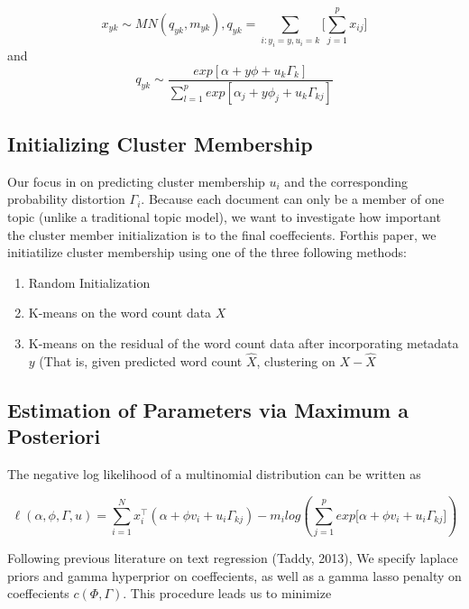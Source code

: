 \documentclass[12pt]{article}
\begin{document}
\begin{equation}
 x_{yk} \sim MN(q_{yk},m_{yk}), q_{yk} = \sum\limits_{i: y_i = y, u_i = k} \big[\sum_{j = 1}^{p} {x_{ij}} \big]
\end{equation}
and 
\begin{equation}
q_{yk} \sim \frac{exp[\alpha + y \phi  + u_k \Gamma_{k}]}{\sum_{l=1}^{p} exp[\alpha_j + y \phi_j+ u_k \Gamma_{kj} ]}
\end{equation}

\subsection{Initializing Cluster Membership}

Our focus in on predicting cluster membership $u_i$ and the
corresponding probability distortion $\Gamma_i$. Because each document can only be a member of one topic (unlike a traditional topic model), we want to investigate how important the cluster member initialization is to the final coeffecients. 
Forthis paper, we initiatilize cluster membership using one of the three following
methods:

\begin{enumerate}
\def\labelenumi{\arabic{enumi}.}
\itemsep1pt\parskip0pt
\item
  Random Initialization
\item
  K-means on the word count data $X$
\item
  K-means on the residual of the word count data after incorporating
  metadata $y$ (That is, given predicted word count $\hat{X}$,
  clustering on $X-\hat{X}$
\end{enumerate}

\subsection{Estimation of Parameters via Maximum a
Posteriori}\label{estimation-of-parameters-via-maximum-a-posteriori}

The negative log likelihood of a multinomial distribution can be written
as

\begin{equation} 
\ell(\alpha,\phi,\Gamma,u) = \sum_{i = 1}^{N}{ x_i^\top (\alpha + \phi v_i + u_i \Gamma_{kj})} - m_i log(\sum_{j = 1}^{p}{exp{\big[ \alpha + \phi v_i + u_i \Gamma_{kj} \big]}})
\end{equation}

Following previous literature on text regression (Taddy, 2013), We specify laplace priors and gamma hyperprior on coeffecients, as well as a gamma lasso penalty on coeffecients $c(\Phi,\Gamma)$. This
procedure leads us to minimize
\end{document}
